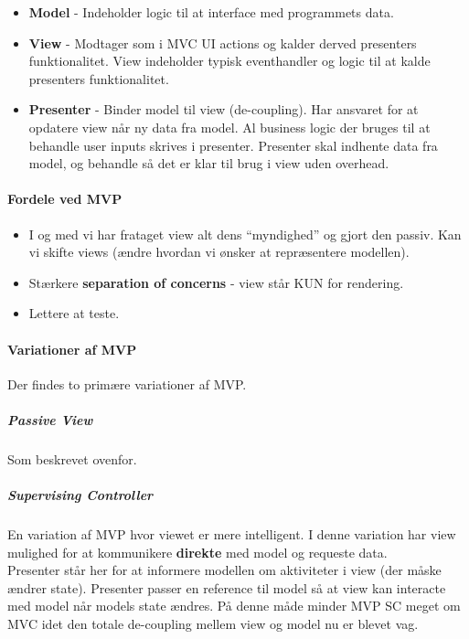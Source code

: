 \begin{itemize}
	\item \textbf{Model} - Indeholder logic til at interface med programmets data.
	\item \textbf{View} - Modtager som i MVC UI actions og kalder derved presenters funktionalitet. View indeholder typisk eventhandler og logic til at kalde presenters funktionalitet.
	\item \textbf{Presenter} - Binder model til view (de-coupling). Har ansvaret for at opdatere view når ny data fra model. Al business logic der bruges til at behandle user inputs skrives i presenter. Presenter skal indhente data fra model, og behandle så det er klar til brug i view uden overhead.
\end{itemize}

\paragraph{Fordele ved MVP}
\begin{itemize}
	\item I og med vi har frataget view alt dens “myndighed” og gjort den passiv. Kan vi skifte views (ændre hvordan vi ønsker at repræsentere modellen).
	\item Stærkere \textbf{separation of concerns} - view står KUN for rendering.
	\item Lettere at teste.
\end{itemize}

\paragraph{Variationer af MVP}
Der findes to primære variationer af MVP.

\subparagraph{Passive View}
Som beskrevet ovenfor.

\subparagraph{Supervising Controller}
En variation af MVP hvor viewet er mere intelligent. I denne variation har view mulighed for at kommunikere \textbf{direkte} med model og requeste data. \\

Presenter står her for at informere modellen om aktiviteter i view (der måske ændrer state). Presenter passer en reference til model så at view kan interacte med model når models state ændres. På denne måde minder MVP SC meget om MVC idet den totale de-coupling mellem view og model nu er blevet vag.


